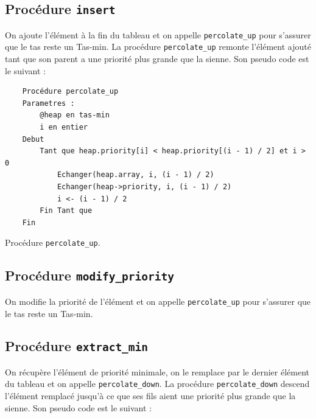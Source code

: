\subsection{Procédure \texttt{insert}}

On ajoute l'élément à la fin du tableau et on appelle \texttt{percolate\_up} pour s'assurer que le tas reste un Tas-min.
La procédure \texttt{percolate\_up} remonte l'élément ajouté tant que son parent a une priorité plus grande que la sienne.
\newline\newline
Son pseudo code est le suivant :

\begin{listing}[!htpb]
    \begin{verbatim}
    Procédure percolate_up
    Parametres :
        @heap en tas-min
        i en entier
    Debut
        Tant que heap.priority[i] < heap.priority[(i - 1) / 2] et i > 0
            Echanger(heap.array, i, (i - 1) / 2)
            Echanger(heap->priority, i, (i - 1) / 2)
            i <- (i - 1) / 2
        Fin Tant que
    Fin
    \end{verbatim}
    \caption{Procédure \texttt{percolate\_up}.}
    \label{listing:percolate_up}
\end{listing}

\subsection{Procédure \texttt{modify\_priority}}

On modifie la priorité de l'élément et on appelle \texttt{percolate\_up} pour s'assurer que le tas reste un Tas-min.

\newpage

\subsection{Procédure \texttt{extract\_min}}

On récupère l'élément de priorité minimale, on le remplace par le dernier élément du tableau et on appelle \texttt{percolate\_down}.
La procédure \texttt{percolate\_down} descend l'élément remplacé jusqu'à ce que ses fils aient une priorité plus grande que la sienne.
\newline\newline
Son pseudo code est le suivant :

